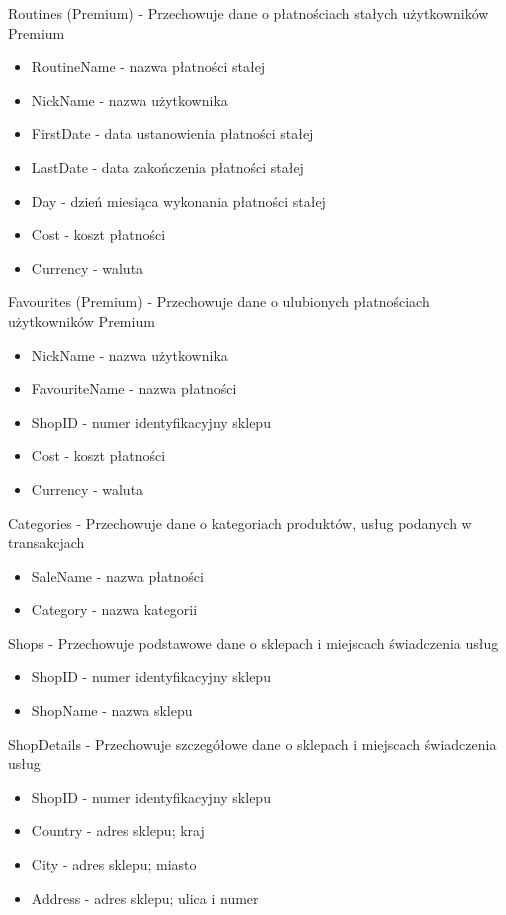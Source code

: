 \documentclass{article}
\begin{document}
    Routines (Premium) - Przechowuje dane o płatnościach stałych użytkowników Premium
    \begin{itemize}
    \item RoutineName - nazwa płatności stałej
    \item NickName - nazwa użytkownika
    \item FirstDate - data ustanowienia płatności stałej
    \item LastDate - data zakończenia płatności stałej
    \item Day - dzień miesiąca wykonania płatności stałej
    \item Cost - koszt płatności
    \item Currency - waluta
    \end{itemize}
    Favourites (Premium) - Przechowuje dane o ulubionych płatnościach użytkowników Premium
    \begin{itemize}
    \item NickName - nazwa użytkownika
    \item FavouriteName - nazwa płatności
    \item ShopID - numer identyfikacyjny sklepu
    \item Cost - koszt płatności
    \item Currency - waluta
    \end{itemize}
    Categories - Przechowuje dane o kategoriach produktów, usług podanych w transakcjach
    \begin{itemize}
    \item SaleName - nazwa płatności
    \item Category - nazwa kategorii
    \end{itemize}
    Shops - Przechowuje podstawowe dane o sklepach i miejscach świadczenia usług
    \begin{itemize}
    \item ShopID - numer identyfikacyjny sklepu
    \item ShopName - nazwa sklepu
    \end{itemize}
    ShopDetails - Przechowuje szczegółowe dane o sklepach i miejscach świadczenia usług
    \begin{itemize}
    \item ShopID - numer identyfikacyjny sklepu
    \item Country - adres sklepu; kraj
    \item City - adres sklepu; miasto
    \item Address - adres sklepu; ulica i numer
    \end{itemize}
    
\end{document}
